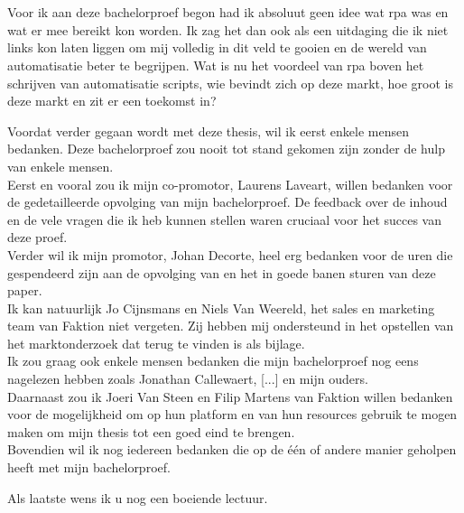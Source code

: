 
\chapter*{}
\label{ch:voorwoord}

Voor ik aan deze bachelorproef begon had ik absoluut geen idee wat \acrlong{rpa} was en wat er mee bereikt kon worden. Ik zag het dan ook als een uitdaging die ik niet links kon laten liggen om mij volledig in dit veld te gooien en de wereld van automatisatie beter te begrijpen. Wat is nu het voordeel van \acrshort{rpa} boven het schrijven van automatisatie scripts, wie bevindt zich op deze markt, hoe groot is deze markt en zit er een toekomst in?

Voordat verder gegaan wordt met deze thesis, wil ik eerst enkele mensen bedanken. Deze bachelorproef zou nooit tot stand gekomen zijn zonder de hulp van enkele mensen.\\
Eerst en vooral zou ik mijn co-promotor, Laurens Laveart, willen bedanken voor de gedetailleerde
opvolging van mijn bachelorproef. De feedback over de inhoud en de vele vragen die ik heb kunnen stellen waren cruciaal voor het succes van deze proef.\\
Verder wil ik mijn promotor, Johan Decorte, heel erg bedanken voor de uren die
gespendeerd zijn aan de opvolging van en het in goede banen sturen van deze paper.\\
Ik kan natuurlijk Jo Cijnsmans en Niels Van Weereld, het sales en marketing team van Faktion niet vergeten. Zij hebben mij ondersteund in het opstellen van het marktonderzoek dat terug te vinden is als bijlage.\\
Ik zou graag ook enkele mensen bedanken die mijn bachelorproef nog eens nagelezen hebben zoals Jonathan Callewaert, [...] en mijn ouders.\\
Daarnaast zou ik Joeri Van Steen en Filip Martens van Faktion willen bedanken voor de mogelijkheid om op hun platform en van hun resources gebruik te mogen maken om mijn thesis tot een goed eind te brengen. \\
Bovendien wil ik nog iedereen bedanken die op de één of andere manier geholpen heeft met mijn bachelorproef.

Als laatste wens ik u nog een boeiende lectuur.

